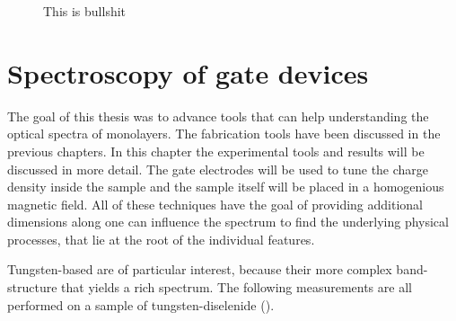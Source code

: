 \begin{figure}[h]
	\centering
	\caption{This is bullshit}
\end{figure}

\chapter{Spectroscopy of \wse gate devices}

The goal of this thesis was to advance tools that can help understanding the optical spectra of \tmdg monolayers. The fabrication tools have been discussed in the previous chapters. In this chapter the experimental tools and results will be discussed in more detail. The gate electrodes will be used to tune the charge density inside the sample and the sample itself will be placed in a homogenious magnetic field. All of these techniques have the goal of providing additional dimensions along one can influence the spectrum to find the underlying physical processes, that lie at the root of the individual features.

Tungsten-based \tmds are of particular interest, because their more complex band-structure that yields a rich spectrum. The following measurements are all performed on a sample of tungsten-diselenide (\wse\!).

